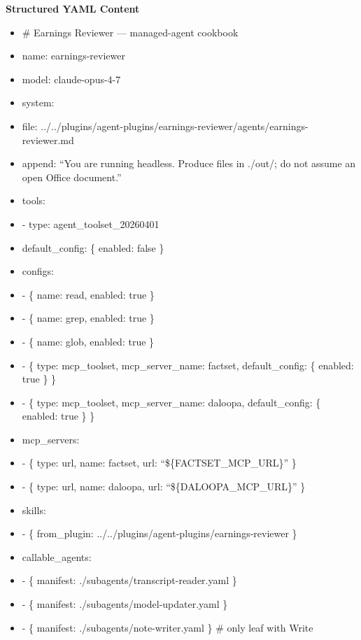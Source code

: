 \documentclass[11pt]{article}
\begin{document}
\textbf{Structured YAML Content}
\begin{itemize}[leftmargin=*,itemsep=2pt,topsep=2pt]
\item {} \# Earnings Reviewer — managed-agent cookbook
\item {} name: earnings-reviewer
\item {} model: claude-opus-4-7
\item {} system:
\item {} file: ../../plugins/agent-plugins/earnings-reviewer/agents/earnings-reviewer.md
\item {} append: ``You are running headless. Produce files in ./out/; do not assume an open Office document.''
\item {} tools:
\item {} - type: agent\_\allowbreak{}toolset\_\allowbreak{}20260401
\item {} default\_\allowbreak{}config: \{ enabled: false \}
\item {} configs:
\item {} - \{ name: read, enabled: true \}
\item {} - \{ name: grep, enabled: true \}
\item {} - \{ name: glob, enabled: true \}
\item {} - \{ type: mcp\_\allowbreak{}toolset, mcp\_\allowbreak{}server\_\allowbreak{}name: factset, default\_\allowbreak{}config: \{ enabled: true \} \}
\item {} - \{ type: mcp\_\allowbreak{}toolset, mcp\_\allowbreak{}server\_\allowbreak{}name: daloopa, default\_\allowbreak{}config: \{ enabled: true \} \}
\item {} mcp\_\allowbreak{}servers:
\item {} - \{ type: url, name: factset, url: ``\$\{FACTSET\_\allowbreak{}MCP\_\allowbreak{}URL\}'' \}
\item {} - \{ type: url, name: daloopa, url: ``\$\{DALOOPA\_\allowbreak{}MCP\_\allowbreak{}URL\}'' \}
\item {} skills:
\item {} - \{ from\_\allowbreak{}plugin: ../../plugins/agent-plugins/earnings-reviewer \}
\item {} callable\_\allowbreak{}agents:
\item {} - \{ manifest: ./subagents/transcript-reader.yaml \}
\item {} - \{ manifest: ./subagents/model-updater.yaml \}
\item {} - \{ manifest: ./subagents/note-writer.yaml \} \# only leaf with Write
\end{itemize}
\end{document}
